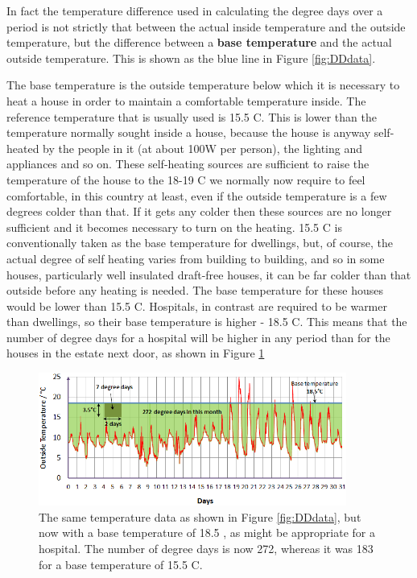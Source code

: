 \documentclass{article}
\begin{document}
In fact the temperature difference used in calculating the degree days over a period is not strictly that between the actual inside temperature and the outside temperature, but the difference between a \textbf{base temperature} and the actual outside temperature. This is shown as the blue line in Figure \ref{fig:DDdata}.

The base temperature is the outside temperature below which it is necessary to heat a house in order to maintain a comfortable temperature inside. The reference temperature that is usually used is 15.5 \degree C. This is lower than the temperature normally sought inside a house, because the house is anyway self-heated by the people in it (at about 100W per person), the lighting and appliances and so on. These self-heating sources are sufficient to raise the temperature of the house to the 18-19 \degree C we normally now require to feel comfortable, in this country at least, even if the outside temperature is a few degrees colder than that. If it gets any colder then these sources are no longer sufficient and it becomes necessary to turn on the heating. 15.5 \degree C is conventionally taken as the base temperature for dwellings, but, of course, the actual degree of self heating varies from building to building, and so in some houses, particularly well insulated draft-free houses, it can be far colder than that outside before any heating is needed. The base temperature for these houses would be lower than 15.5 \degree C. Hospitals, in contrast are required to be warmer than dwellings, so their base temperature is higher - 18.5 \degree C. This means that the number of degree days for a hospital will be higher in any period than for the houses in the estate next door, as shown in Figure \ref{fig:high_BT}

\begin{figure}[ht]
\includegraphics[width=0.9\textwidth]{one_month_BT18pt5}
\caption{The same temperature data as shown in Figure \ref{fig:DDdata}, but now with a base temperature of 18.5 \degree, as might be appropriate for a hospital. The number of degree days is now 272, whereas it was 183 for a base temperature of 15.5 \degree C.}
\label{fig:high_BT}
\end{figure}
\end{document}
